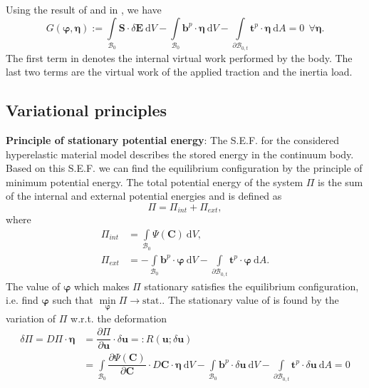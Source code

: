 Using the result of  and  in , we have
\begin{equation}
G(\bm{\varphi},\bm{\eta}):= \int\limits_{\mathcal{B}_0} \mathbf{S} \cdot \delta \mathbf{E} \ \mathrm{d}V - \int\limits_{\mathcal{B}_0} \mathbf{b}^p \cdot \bm{\eta} \ \mathrm{d}V - \int\limits_{\mathcal{\partial B}_{0,t}} \mathbf{t}^p \cdot \bm{\eta} \ \mathrm{d}A = 0 \ \ \forall \bm{\eta}.
\label{eq:2.11}
\end{equation}
The first term in  denotes the internal virtual work performed by the body. The last two terms are the virtual work of the applied traction and the inertia load.

\subsection{Variational principles}
\textbf{Principle of stationary potential energy}: The S.E.F. for the considered hyperelastic material model describes the stored energy in the continuum body. Based on this S.E.F. we can find the equilibrium configuration by the principle of minimum potential energy. The total potential energy of the system $\Pi$ is the sum of the internal and external potential energies and is defined as 
\begin{equation}
\Pi = \Pi_{int} + \Pi_{ext},
\label{eq:2.12}
\end{equation}
where 
\begin{align}
\Pi_{int} &= \int\limits_{\mathcal{B}_0} \Psi (\mathbf{C}) \ \mathrm{d}V, \\
\Pi_{ext} &= - \int\limits_{\mathcal{B}_0} \mathbf{b}^p \cdot \bm{\varphi} \ \mathrm{d}V - \int\limits_{\mathcal{\partial B}_{0,t}} \mathbf{t}^p \cdot \bm{\varphi} \ \mathrm{d}A.
\end{align}
The value of $\bm{\varphi}$ which makes $\Pi$ stationary satisfies the equilibrium configuration, i.e. find $\bm{\varphi}$ such that $\min\limits_{\bm{\varphi}} \Pi \to \text{stat.}$. The stationary value of  is found by the variation of $\Pi$ w.r.t. the deformation
\begin{align}
\delta \Pi = D \Pi \cdot \bm{\eta} &= \dfrac{\partial \Pi}{\partial \mathbf{u}} \cdot \delta \mathbf{u} =: R(\mathbf{u}; \delta \mathbf{u})\nonumber \\
&= \int\limits_{\mathcal{B}_0} \dfrac{\partial \Psi (\mathbf{C})}{\partial \mathbf{C}} \cdot D \mathbf{C} \cdot \bm{\eta} \ \mathrm{d}V - \int\limits_{\mathcal{B}_0} \mathbf{b}^p \cdot \delta \mathbf{u} \ \mathrm{d}V - \int\limits_{\mathcal{\partial B}_{0,t}} \mathbf{t}^p \cdot \delta \mathbf{u} \ \mathrm{d}A = 0
\end{align}
